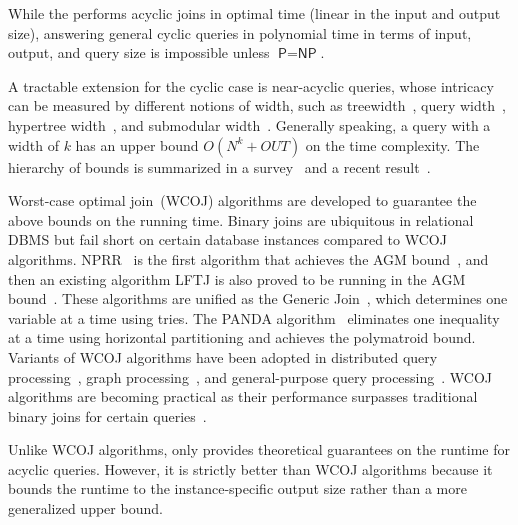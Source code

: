 While the \YannAlg performs acyclic joins in optimal time (linear in the input and output size), answering general cyclic queries in polynomial time in terms of input, output, and query size is impossible unless $\textsf{P}=\textsf{NP}$.

A tractable extension for the cyclic case is near-acyclic queries, whose intricacy can be measured by different notions of width, such as treewidth~\cite{ROBERTSON1986309}, 
query width~\cite{chandra1997}, hypertree width~\cite{gottlob1999}, and submodular width~\cite{Marx10}. Generally speaking, a query with a width of $k$ has an upper bound $O(N^k+OUT)$ on the time complexity.
The hierarchy of bounds is summarized in a survey~\cite{suciu2023} and a recent result~\cite{lpnorm2024}.

Worst-case optimal join~(WCOJ) algorithms are developed to guarantee the above bounds on the running time. Binary joins are ubiquitous in relational DBMS but fail short on certain database instances compared to WCOJ algorithms. NPRR~\cite{nprr12} is the first algorithm that achieves the AGM bound~\cite{agm08}, and then an existing algorithm LFTJ is also proved to be running in the AGM bound~\cite{2014leapfrog}. These algorithms are unified as the Generic Join~\cite{ngo2014SIGMOD,ngo2018}, which determines one variable at a time using tries. The PANDA algorithm~\cite{panda2017,panda2024} eliminates one inequality at a time using horizontal partitioning and achieves the polymatroid bound. Variants of WCOJ algorithms have been adopted in distributed query processing~\cite{chu2015theory, koutris2016worst, ammar2018distributed}, graph  processing~\cite{zhang2014evaluating, aberger2017emptyheaded, ammar2018distributed, hogan2019worst, mhedhbi2019optimizing, zhu2019hymj}, and general-purpose query processing~\cite{aref2015design, aberger2018levelheaded,2020hashtrie}. WCOJ algorithms are becoming practical as their performance surpasses traditional binary joins for certain queries~\cite{freejoin2023}.

Unlike WCOJ algorithms, \RPT only provides theoretical guarantees on the runtime for acyclic queries. However, it is strictly better than WCOJ algorithms because it bounds the runtime to the instance-specific output size rather than a more generalized upper bound.